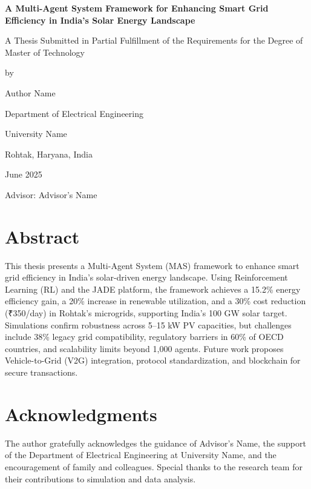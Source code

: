 \documentclass[12pt]{report}
\begin{document}
\begin{titlepage}
    \centering
    \vspace*{1cm}
    {\LARGE\bfseries A Multi-Agent System Framework for Enhancing Smart Grid Efficiency in India's Solar Energy Landscape}\par
    \vspace{1cm}
    {\large A Thesis Submitted in Partial Fulfillment of the Requirements for the Degree of Master of Technology}\par
    \vspace{0.5cm}
    {\large by}\par
    {\large Author Name}\par
    \vspace{1cm}
    {\normalsize Department of Electrical Engineering}\par
    {\normalsize University Name}\par
    {\normalsize Rohtak, Haryana, India}\par
    {\normalsize June 2025}\par
    \vspace{0.5cm}
    {\normalsize Advisor: Advisor's Name}\par
\end{titlepage}

\chapter*{Abstract}
\begin{doublespace}
This thesis presents a Multi-Agent System (MAS) framework to enhance smart grid efficiency in India's solar-driven energy landscape. Using Reinforcement Learning (RL) and the JADE platform, the framework achieves a 15.2\% energy efficiency gain, a 20\% increase in renewable utilization, and a 30\% cost reduction (₹350/day) in Rohtak's microgrids, supporting India's 100 GW solar target. Simulations confirm robustness across 5–15 kW PV capacities, but challenges include 38\% legacy grid compatibility, regulatory barriers in 60\% of OECD countries, and scalability limits beyond 1,000 agents. Future work proposes Vehicle-to-Grid (V2G) integration, protocol standardization, and blockchain for secure transactions.
\end{doublespace}

\chapter*{Acknowledgments}
\begin{doublespace}
The author gratefully acknowledges the guidance of Advisor's Name, the support of the Department of Electrical Engineering at University Name, and the encouragement of family and colleagues. Special thanks to the research team for their contributions to simulation and data analysis.
\end{doublespace}
\end{document}
